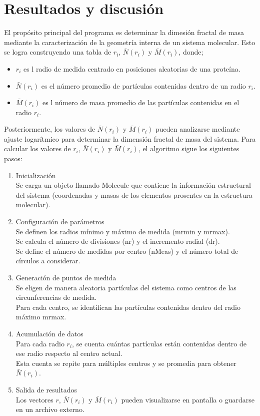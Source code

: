 \chapter{Resultados y discusión}

El propósito principal del programa es determinar la dimesi\'{o}n fractal de masa mediante la caracterizaci\'{o}n de la geometría interna de un sistema molecular. Esto se logra construyendo una tabla de \(r_i\), \( \bar{N}(r_i)\) y \( \bar{M}(r_i)\), donde;

\begin{itemize}
	\item \(r_i\) es l radio de medida centrado en posiciones aleatorias de una proteína.
	\item \( \bar{N}(r_i)\) es el número promedio de partículas contenidas dentro de un radio \(r_i\). 
	\item  \( \bar{M}(r_i)\) es l n\'{u}mero de masa promedio de las part\'{i}culas contenidas en el radio \(r_i\).
\end{itemize}

Posteriormente, los valores de \( \bar{N}(r_i) \) y \( \bar{M}(r_i)\) pueden analizarse mediante ajuste logarítmico para determinar la dimensión fractal de masa del sistema. Para calcular los valores de \(r_i\), \( \bar{N}(r_i)\) y \( \bar{M}(r_i)\), el algoritmo sigue los siguientes pasos:

\begin{enumerate}
	\item Inicialización\\
	 Se carga un objeto llamado Molecule que contiene la información estructural del sistema (coordenadas y masas de los elementos prosentes en la estructura molecular).
	
	\item Configuración de parámetros\\
	Se definen los radios mínimo y máximo de medida (mrmin y mrmax).\\
	Se calcula el número de divisiones (nr) y el incremento radial (dr).\\
	Se define el número de medidas por centro (nMeas) y el número total de círculos a considerar.
	
	\item Generación de puntos de medida\\
	Se eligen de manera aleatoria partículas del sistema como centros de las circunferencias de medida.\\
	Para cada centro, se identifican las partículas contenidas dentro del radio máximo mrmax.
	
	\item Acumulación de datos\\
	Para cada radio \( r_i \), se cuenta cuántas partículas están contenidas dentro de ese radio respecto al centro actual.\\
	Esta cuenta se repite para múltiples centros y se promedia para obtener \( \bar{N}(r_i) \).
	
	
	\item Salida de resultados\\
	Los vectores \( r \), \( \bar{N}(r_i) \) y \( \bar{M}(r_i)\) pueden visualizarse en pantalla o guardarse en un archivo externo.
\end{enumerate}
